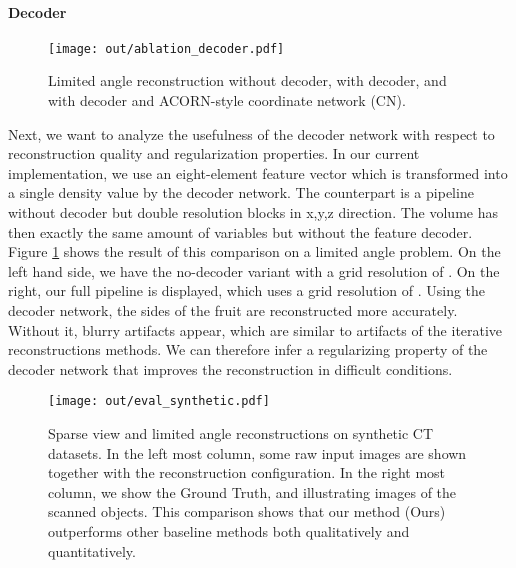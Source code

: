 \documentclass[acmtog,nonacm]{acmart} \acmSubmissionID{0438}
\begin{document}
\paragraph{Decoder}
\begin{figure}
\texttt{[image: out/ablation\_decoder.pdf]}
	\caption{
		Limited angle reconstruction without decoder, with decoder, and with decoder and ACORN-style coordinate network (CN).
	}
	\label{fig:decoder}
\end{figure}
Next, we want to analyze the usefulness of the decoder network with respect to reconstruction quality and regularization properties.
In our current implementation, we use an eight-element feature vector which is transformed into a single density value by the decoder network.
The counterpart is a pipeline without decoder but double resolution blocks in x,y,z direction.
The volume has then exactly the same amount of variables but without the feature decoder.
Figure \ref{fig:decoder} shows the result of this comparison on a limited angle problem.
On the left hand side, we have the no-decoder variant with a grid resolution of . 
On the right, our full pipeline is displayed, which uses a grid resolution of . 
Using the decoder network, the sides of the fruit are reconstructed more accurately.
Without it, blurry artifacts appear, which are similar to artifacts of the iterative reconstructions methods.
We can therefore infer a regularizing property of the decoder network that improves the reconstruction in difficult conditions.


\begin{figure*}
\texttt{[image: out/eval\_synthetic.pdf]}
	\caption{
		Sparse view and limited angle reconstructions on synthetic CT datasets.
		In the left most column, some raw input images are shown together with the reconstruction configuration.
		In the right most column, we show the Ground Truth, and illustrating images of the scanned objects.
		This comparison shows that our method (Ours) outperforms other baseline methods both qualitatively and quantitatively.
	}
	\label{fig:synth_recons}
\end{figure*}
\end{document}
